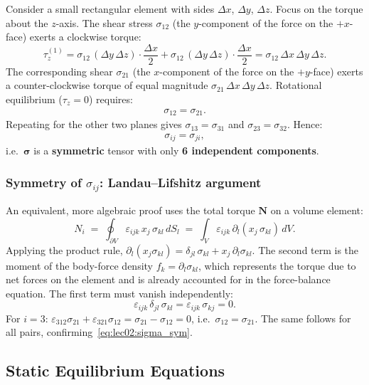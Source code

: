 Consider a small rectangular element with sides $\Delta x$, $\Delta y$,
$\Delta z$.  Focus on the torque about the $z$-axis.  The shear stress
$\sigma_{12}$ (the $y$-component of the force on the $+x$-face) exerts
a clockwise torque:
\[
    \tau_z^{(1)} = \sigma_{12}\,(\Delta y\,\Delta z)\cdot\frac{\Delta x}{2}
                  + \sigma_{12}\,(\Delta y\,\Delta z)\cdot\frac{\Delta x}{2}
                 = \sigma_{12}\,\Delta x\,\Delta y\,\Delta z.
\]
The corresponding shear $\sigma_{21}$ (the $x$-component of the force on
the $+y$-face) exerts a counter-clockwise torque of equal magnitude
$\sigma_{21}\,\Delta x\,\Delta y\,\Delta z$.  Rotational equilibrium
($\tau_z = 0$) requires:
\begin{align}
    \sigma_{12} = \sigma_{21}.
    \label{eq:lec02:sigma_sym_12}
\end{align}
Repeating for the other two planes gives $\sigma_{13}=\sigma_{31}$ and
$\sigma_{23}=\sigma_{32}$.  Hence:
\begin{align}
    \boxed{\sigma_{ij} = \sigma_{ji}},
    \label{eq:lec02:sigma_sym}
\end{align}
i.e.\ $\bm{\sigma}$ is a \textbf{symmetric} tensor with only
\textbf{6 independent components}.

\subsubsection*{Symmetry of $\sigma_{ij}$: Landau--Lifshitz argument}

An equivalent, more algebraic proof uses the total torque $\mathbf{N}$
on a volume element:
\[
    N_i \;=\; \oint_{\partial V} \varepsilon_{ijk}\,x_j\,\sigma_{kl}\,dS_l
         \;=\; \int_V \varepsilon_{ijk}\,\partial_l(x_j\,\sigma_{kl})\,dV.
\]
Applying the product rule, $\partial_l(x_j\sigma_{kl})
= \delta_{jl}\,\sigma_{kl} + x_j\,\partial_l\sigma_{kl}$.
The second term is the moment of the body-force density $f_k = \partial_l\sigma_{kl}$,
which represents the torque due to net forces on the element and is
already accounted for in the force-balance equation.  The first term
must vanish independently:
\[
    \varepsilon_{ijk}\,\delta_{jl}\,\sigma_{kl}
    = \varepsilon_{ijk}\,\sigma_{kj} = 0.
\]
For $i=3$: $\varepsilon_{312}\sigma_{21} + \varepsilon_{321}\sigma_{12}
    = \sigma_{21} - \sigma_{12} = 0$,
i.e.\ $\sigma_{12}=\sigma_{21}$.  The same follows for all pairs,
confirming~\eqref{eq:lec02:sigma_sym}.

\subsection{Static Equilibrium Equations}
\label{subsec:lec02:equil}

